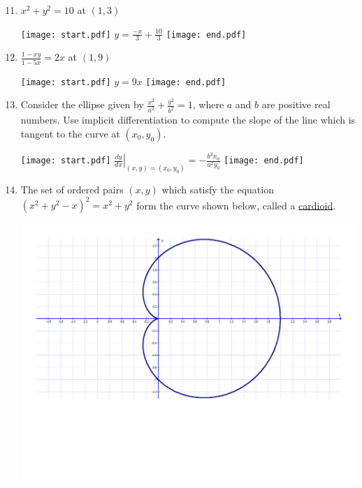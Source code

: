 \documentclass[12pt]{article}
\begin{document}
\newpage


\begin{enumerate}
\setcounter{enumi}{10}

\item $x^2+y^2 = 10$ at $(1,3)$ 

\texttt{[image: start.pdf]}
{{$y=\frac{-x}{3}+\frac{10}{3}$}}
\texttt{[image: end.pdf]}


\item $\frac{1-xy}{1-5x}=2x$ at $(1,9)$ 

\texttt{[image: start.pdf]}
{{$y=9x$}}
\texttt{[image: end.pdf]}


\item Consider the ellipse given by $\frac{x^2}{a^2}+\frac{y^2}{b^2}=1$, where $a$ and $b$ are positive real numbers.  Use implicit differentiation to compute the slope of the line which is tangent to the curve at $(x_0,y_0)$.

\texttt{[image: start.pdf]}
{{$\left.\frac{dy}{dx}\right|_{(x,y)=(x_0,y_0)}=-\frac{b^2x_0}{a^2y_0}$}}
\texttt{[image: end.pdf]}


\item The set of ordered pairs $(x,y)$ which satisfy the equation $(x^2+y^2-x)^2=x^2+y^2$ form the curve shown below, called a \underline{cardioid}.

\begin{center}
\includegraphics[scale=0.5]{cardioid.pdf}
\end{center}


\end{enumerate}
\end{document}

